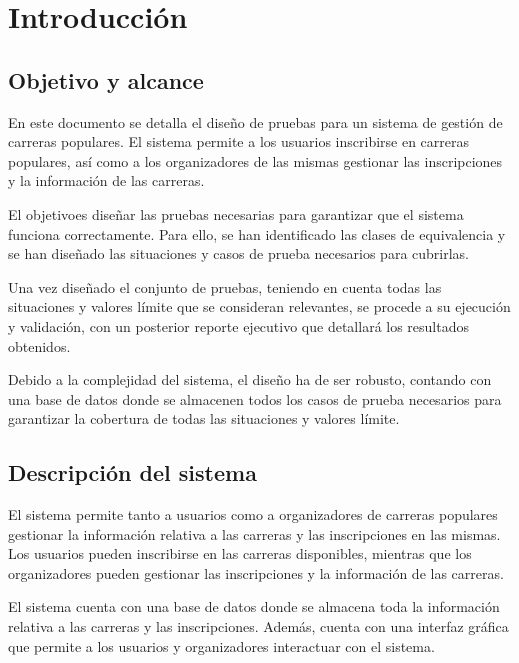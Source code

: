\chapter{Introducción}
\section{Objetivo y alcance}
En este documento se detalla el diseño de pruebas para un sistema de gestión de carreras populares.
El sistema permite a los usuarios inscribirse en carreras populares, así como a los organizadores de
las mismas gestionar las inscripciones y la información de las carreras.

El objetivoes diseñar las pruebas necesarias para garantizar que el sistema funciona correctamente.
Para ello, se han identificado las clases de equivalencia y se han diseñado las situaciones y casos
de prueba necesarios para cubrirlas.

Una vez diseñado el conjunto de pruebas, teniendo en cuenta todas las situaciones y valores límite que se
consideran relevantes, se procede a su ejecución y validación, con un posterior reporte ejecutivo que
detallará los resultados obtenidos.

Debido a la complejidad del sistema, el diseño ha de ser robusto, contando con una base de datos donde
se almacenen todos los casos de prueba necesarios para garantizar la cobertura de todas las situaciones
y valores límite.

\section{Descripción del sistema}
El sistema permite tanto a usuarios como a organizadores de carreras populares gestionar la información
relativa a las carreras y las inscripciones en las mismas. Los usuarios pueden inscribirse en las carreras
disponibles, mientras que los organizadores pueden gestionar las inscripciones y la información de las
carreras.

El sistema cuenta con una base de datos donde se almacena toda la información relativa a las carreras y
las inscripciones. Además, cuenta con una interfaz gráfica que permite a los usuarios y organizadores
interactuar con el sistema.


